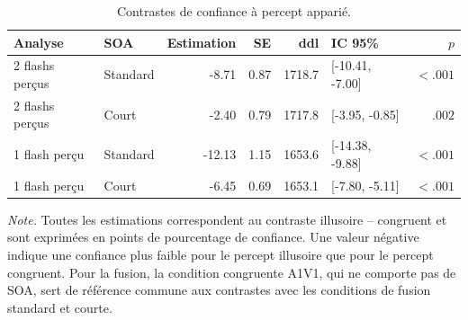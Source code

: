 \begin{table}[ht]
\centering
\caption{Contrastes de confiance à percept apparié.}
\label{tab:matched_confidence_contrasts_v2}
\scriptsize
\begin{tabular}{p{4.0cm}p{1.4cm}rrrp{2.6cm}r}
\toprule
Analyse & SOA & Estimation & SE & ddl & IC 95\% & $p$ \\
\midrule
2 flashs perçus & Standard & -8.71 & 0.87 & 1718.7 & [-10.41, -7.00] & $< .001$ \\
2 flashs perçus & Court & -2.40 & 0.79 & 1717.8 & [-3.95, -0.85] & $.002$ \\
1 flash perçu & Standard & -12.13 & 1.15 & 1653.6 & [-14.38, -9.88] & $< .001$ \\
1 flash perçu & Court & -6.45 & 0.69 & 1653.1 & [-7.80, -5.11] & $< .001$ \\
\bottomrule
\end{tabular}

\vspace{0.2cm}
\begin{minipage}{0.92\textwidth}
\footnotesize
\textit{Note.} Toutes les estimations correspondent au contraste illusoire -- congruent et sont exprimées en points de pourcentage de confiance. Une valeur négative indique une confiance plus faible pour le percept illusoire que pour le percept congruent. Pour la fusion, la condition congruente A1V1, qui ne comporte pas de SOA, sert de référence commune aux contrastes avec les conditions de fusion standard et courte.
\end{minipage}
\end{table}

